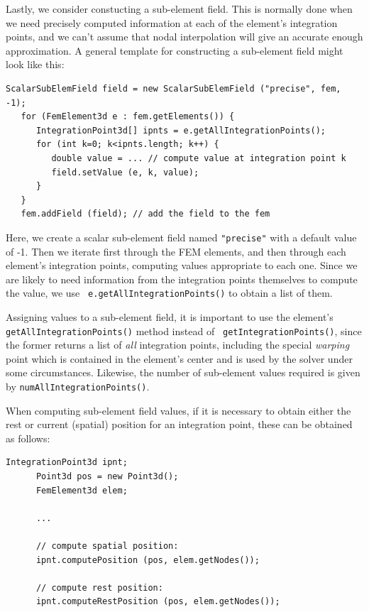 Lastly, we consider constucting a sub-element field. This is normally
done when we need precisely computed information at each of the
element's integration points, and we can't assume that nodal
interpolation will give an accurate enough approximation. A general
template for constructing a sub-element field might look like this:
%
\begin{lstlisting}[]
   ScalarSubElemField field = new ScalarSubElemField ("precise", fem, -1);
   for (FemElement3d e : fem.getElements()) {
      IntegrationPoint3d[] ipnts = e.getAllIntegrationPoints();
      for (int k=0; k<ipnts.length; k++) {
         double value = ... // compute value at integration point k
         field.setValue (e, k, value);
      }
   }
   fem.addField (field); // add the field to the fem
\end{lstlisting}
%
Here, we create a scalar sub-element field named {\tt "precise"} with
a default value of -1. Then we iterate first through the FEM elements,
and then through each element's integration points, computing values
appropriate to each one. Since we are likely to need information from
the integration points themselves to compute the value, we use {\tt
e.getAllIntegrationPoints()} to obtain a list of them. 

\begin{sideblock}
Assigning values to a sub-element field, it is important to use the
element's {\tt getAllIntegrationPoints()} method instead of {\tt
getIntegrationPoints()}, since the former returns a list of {\it all}
integration points, including the special {\it warping} point which is
contained in the element's center and is used by the solver under some
circumstances. Likewise, the number of sub-element values
required is given by {\tt numAllIntegrationPoints()}.
\end{sideblock}

When computing sub-element field values, if it is necessary to obtain
either the rest or current (spatial) position for an integration
point, these can be obtained as follows:
%
\begin{lstlisting}[]
      IntegrationPoint3d ipnt;
      Point3d pos = new Point3d();
      FemElement3d elem;

      ...

      // compute spatial position:
      ipnt.computePosition (pos, elem.getNodes());

      // compute rest position:
      ipnt.computeRestPosition (pos, elem.getNodes());
\end{lstlisting}
%

